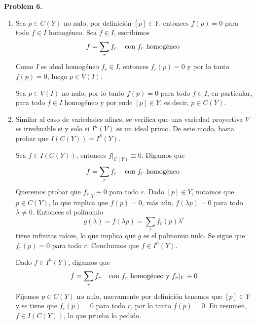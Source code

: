 \documentclass{article}
\begin{document}
\vspace{5mm}
\noindent\textbf{Problem 6.}
\begin{enumerate}
    \item[(a)] Sea $p\in C(Y)$ no nulo, por definición $[p]\in Y$, entonces $f(p)=0$ para todo 
    $f\in I$ homogéneo. Sea $f\in I$, escribimos
    \begin{equation*}
        f=\sum_{r}f_{r} \hspace{4mm}\text{con $f_{r}$ homogéneo }
    \end{equation*}
    Como $I$ es ideal homogéneo $f_{r}\in I$, entonces $f_{r}(p)=0$ y por lo tanto $f(p)=0$, luego
    $p\in V(I)$.

    \vspace{1mm}
    Sea $p\in V(I)$ no nulo, por lo tanto $f(p)=0$ para todo $f\in I$, en particular, para todo 
    $f\in I$ homogéneo y por ende $[p]\in Y$, es decir, $p\in C(Y)$.

    \item[(b)] Similar al caso de variedades afines, se verifica que una variedad proyectiva $V$ 
    es irreducible si y solo si $I^{h}(V)$ es un ideal primo. De este modo, basta probar que
    $I(C(Y))=I^{h}(Y)$.

    Sea $f\in I(C(Y))$, entonces $f|_{C(Y)}\equiv0$. Digamos que
    \begin{equation*}
        f=\sum_{r}f_{r} \hspace{4mm}\text{con $f_{r}$ homogéneo }
    \end{equation*}
    Queremos probar que $f_{r}|_{Y}\equiv0$ para todo $r$. Dado $[p]\in Y$, notamos que 
    $p\in C(Y)$, lo que implica que $f(p)=0$, más aún, $f(\lambda p)=0$ para todo $\lambda\neq0$.
    Entonces el polinomio
    \begin{equation*}
        g(\lambda)=f(\lambda p)=\sum_{r}f_{r}(p)\lambda^{r}
    \end{equation*}
    tiene infinitas raíces, lo que implica que $g$ es el polinomio nulo. Se sigue que $f_{r}(p)=0$
    para todo $r$. Concluimos que $f\in I^{h}(Y)$.

    Dado $f\in I^{h}(Y)$, digamos que
    \begin{equation*}
        f=\sum_{r}f_{r} \hspace{4mm}\text{con $f_{r}$ homogéneo y }f_{r}|_{Y}\equiv0
    \end{equation*}
    Fijemos $p\in C(Y)$ no nulo, nuevamente por definición tenemos que $[p]\in Y$ y se tiene que 
    $f_{r}(p)=0$ para todo $r$, por lo tanto $f(p)=0$. En resumen, $f\in I(C(Y))$, lo que prueba
    lo pedido.
\end{enumerate}

\end{document}
